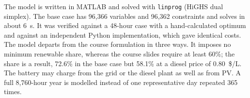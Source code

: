 The model is written in MATLAB and solved with \texttt{linprog} (HiGHS dual simplex). The base case has
96,366 variables and 96,362 constraints and solves in about 6~s. It was verified against a 48-hour case
with a hand-calculated optimum and against an independent Python implementation, which gave identical
costs. The model departs from the course formulation in three ways. It imposes no minimum renewable
share, whereas the course slides require at least 60\%; the share is a result, 72.6\% in the base case
but 58.1\% at a diesel price of 0.80~\$/L. The battery may charge from the grid or the diesel plant as
well as from PV. A full 8,760-hour year is modelled instead of one representative day repeated 365
times.
